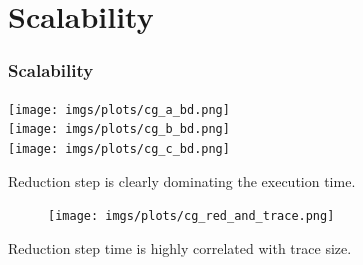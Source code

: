 \documentclass{beamer}
\begin{document}
\section{Scalability}
\begin{frame}
	\frametitle{Scalability}
	\begin{multicols}{2}
		\texttt{[image: imgs/plots/cg\_a\_bd.png]}\\
		\texttt{[image: imgs/plots/cg\_b\_bd.png]}\\
		\texttt{[image: imgs/plots/cg\_c\_bd.png]}\\
	\vfill
	\pause
	\begin{mdframed}[backgroundcolor=black!10,roundcorner=5pt,linewidth=0pt]
		Reduction step is clearly dominating the execution time.
	\end{mdframed}
	\pause
	\columnbreak
	\vfill
	\begin{figure}
		\texttt{[image: imgs/plots/cg\_red\_and\_trace.png]}
	\end{figure}
	\vfill
	\begin{mdframed}[backgroundcolor=black!10,roundcorner=5pt,linewidth=0pt]
		Reduction step time is highly correlated with trace size.
	\end{mdframed}
	
	\end{multicols}
\end{frame}
\end{document}
